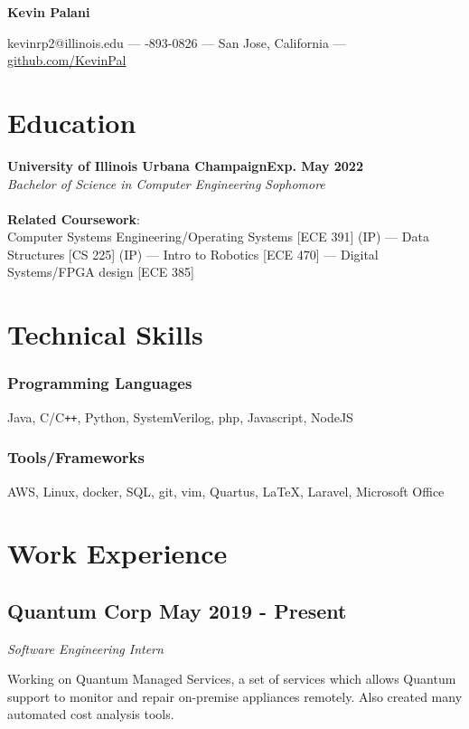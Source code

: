 \documentclass[letterpaper,11pt]{article}
\makeatletter
\newcommand\textbox[1]{%
    \parbox{.333\textwidth}{#1}%
}
\renewcommand{\maketitle}{
    \begin{center}
        \noindent\textbox{\hfill}\textbox{\hfil\bfseries\huge Kevin Palani \hfil}\vspace{3mm}\textbox{\hfill}
        {\faEnvelope \enskip kevinrp2@illinois.edu --- \faPhone \enskip 408-893-0826 --- \faHome \enskip San Jose, California --- \faGithub \enskip \underline{\href{https://github.com/KevinPal}{github.com/KevinPal}}}
    \end{center} }
\makeatother
\begin{document}
\maketitle
\section{Education}
    {\textbf{University of Illinois Urbana Champaign}}\null\hfill\textbf{Exp. May 2022}\\
    \emph{Bachelor of Science in Computer Engineering} \null\hfill \emph{Sophomore}\\
    \vspace*{-4mm}\\
    \textbf{Related Coursework}:\\ Computer Systems Engineering/Operating Systems [ECE 391] (IP) --- Data Structures [CS 225] (IP) --- Intro to Robotics [ECE 470] --- Digital Systems/FPGA design [ECE 385]
\section{Technical Skills}
    \subsubsection{Programming Languages}
    Java, C/C\verb!++!, Python, SystemVerilog, php, Javascript, NodeJS
    \vspace*{-2mm}
    \subsubsection{Tools/Frameworks}
    AWS, Linux, docker, SQL, git, vim, Quartus, \LaTeX, Laravel, Microsoft Office
    \vspace*{-2mm}
\section{Work Experience}
    \subsection{Quantum Corp \null\hfill May 2019 - Present}
    \vspace*{-2mm}
    \emph{Software Engineering Intern} \null\hfill \emph{}
    \vspace*{1mm}

    Working on Quantum Managed Services, a set of services which allows Quantum support to monitor and repair on-premise appliances remotely. Also created many automated cost analysis tools.
    \vspace*{-2mm}
\end{document}
